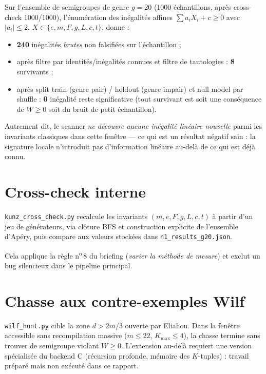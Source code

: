 \documentclass[11pt,a4paper]{article}
\begin{document}
Sur l'ensemble de semigroupes de genre $g=20$ (\num{1000} échantillons,
après cross-check 1000/1000), l'énumération des inégalités affines
$\sum a_i X_i + c\ge 0$ avec $|a_i|\le 2$, $X\in\{e,m,F,g,L,c,t\}$,
donne :
\begin{itemize}
  \item \textbf{240} inégalités \emph{brutes} non falsifiées sur l'échantillon ;
  \item après filtre par identités/inégalités connues et filtre de tautologies :
  \textbf{8} survivants ;
  \item après split train (genre pair) / holdout (genre impair) et null model
  par shuffle : \textbf{0} inégalité reste significative
  (tout survivant est soit une conséquence de $W\ge 0$ soit du bruit de
  petit échantillon).
\end{itemize}

Autrement dit, le scanner \emph{ne découvre aucune inégalité linéaire
nouvelle} parmi les invariants classiques dans cette fenêtre --- ce qui
est un résultat négatif sain : la signature locale n'introduit pas
d'information linéaire au-delà de ce qui est déjà connu.

\section{Cross-check interne}

\texttt{kunz\_cross\_check.py} recalcule les invariants
$(m,e,F,g,L,c,t)$ à partir d'un jeu de générateurs, via clôture BFS et
construction explicite de l'ensemble d'Apéry, puis compare aux valeurs
stockées dans \texttt{n1\_results\_g20.json}.
\begin{center}
\end{center}
Cela applique la règle n\textsuperscript{o}\,8 du briefing
(\emph{varier la méthode de mesure}) et exclut un bug silencieux dans
le pipeline principal.

\section{Chasse aux contre-exemples Wilf}

\texttt{wilf\_hunt.py} cible la zone $d>2m/3$ ouverte par Eliahou.
Dans la fenêtre accessible sans recompilation massive
($m\le 22$, $K_{\max}\le 4$), la chasse termine sans trouver de
semigroupe violant $W\ge 0$. L'extension au-delà requiert une version
spécialisée du backend C (récursion profonde, mémoire des $K$-tuples) :
travail préparé mais non exécuté dans ce rapport.
\end{document}
